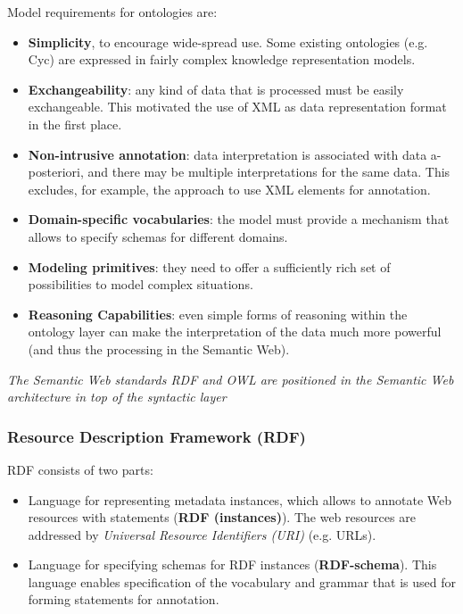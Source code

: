	Model requirements for ontologies are:
	\begin{itemize}
		\item \textbf{Simplicity}, to encourage wide-spread use. Some existing ontologies (e.g. Cyc) are expressed in fairly complex knowledge representation models.
		\item \textbf{Exchangeability}: any kind of data that is processed must be easily exchangeable. This motivated the use of XML as data representation format in the first place.
		\item \textbf{Non-intrusive annotation}: data interpretation is associated with data a-posteriori, and there may be multiple interpretations for the same data.  This excludes, for example, the approach to use XML elements for annotation.
		\item \textbf{Domain-specific vocabularies}: the model must provide a mechanism that allows to specify schemas for different domains.
		\item \textbf{Modeling primitives}: they need to offer a sufficiently rich set of possibilities to model complex situations.
		\item \textbf{Reasoning Capabilities}: even simple forms of reasoning within the ontology layer can make the interpretation of the data much more powerful (and thus the processing in the Semantic Web).
	\end{itemize}

	\emph{The Semantic Web standards RDF and OWL are positioned in the Semantic Web architecture in top of the syntactic layer}

\subsubsection{Resource Description Framework (RDF)} %
\label{ssub:rdf_rdf_resource_description_framework}
	RDF consists of two parts:
	\begin{itemize}
		\item Language for representing metadata instances, which allows to annotate Web resources with statements (\textbf{RDF (instances)}). The web resources are addressed by \emph{Universal Resource Identifiers (URI)} (e.g. URLs).
		\item Language for specifying schemas for RDF instances (\textbf{RDF-schema}). This language enables specification of the vocabulary and grammar that is used for forming statements for annotation.
	\end{itemize}

